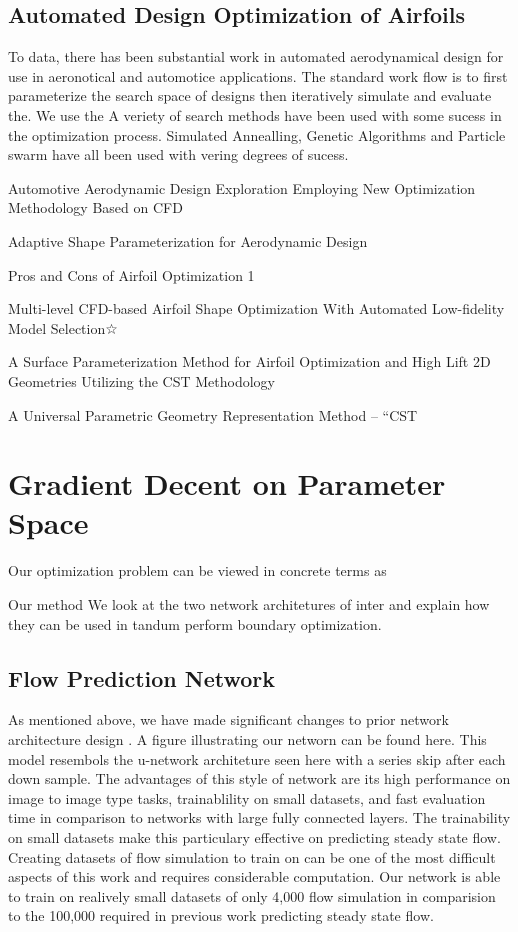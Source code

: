 \documentclass{article} %
\begin{document}
\subsection{Automated Design Optimization of Airfoils}

To data, there has been substantial work in automated aerodynamical design for use in aeronotical and automotice applications. The standard work flow is to first parameterize the search space of designs then iteratively simulate and evaluate the. We use the A veriety of search methods have been used with some sucess in the optimization process. Simulated Annealling, Genetic Algorithms and Particle swarm have all been used with vering degrees of sucess. 


Automotive Aerodynamic Design Exploration
Employing New Optimization Methodology Based
on CFD

Adaptive Shape Parameterization for
Aerodynamic Design

Pros and Cons of Airfoil Optimization 1

Multi-level CFD-based Airfoil Shape Optimization With Automated Low-fidelity Model Selection☆

A Surface Parameterization Method for Airfoil Optimization
and High Lift 2D Geometries Utilizing the CST Methodology

A Universal Parametric Geometry Representation Method –
“CST


\section{Gradient Decent on Parameter Space}

Our optimization problem can be viewed in concrete terms as 

Our method We look at the two network architetures of inter and explain how they can be used in tandum perform boundary optimization.

\subsection{Flow Prediction Network}

As mentioned above, we have made significant changes to prior network architecture design . A figure illustrating our networn can be found here. This model resembols the u-network architeture seen here with a series skip after each down sample. The advantages of this style of network are its high performance on image to image type tasks, trainablility on small datasets, and fast evaluation time in comparison to networks with large fully connected layers. The trainability on small datasets make this particulary effective on predicting steady state flow. Creating datasets of flow simulation to train on can be one of the most difficult aspects of this work and requires considerable computation. Our network is able to train on realively small datasets of only 4,000 flow simulation in comparision to the 100,000 required in previous work predicting steady state flow. 
\end{document}
